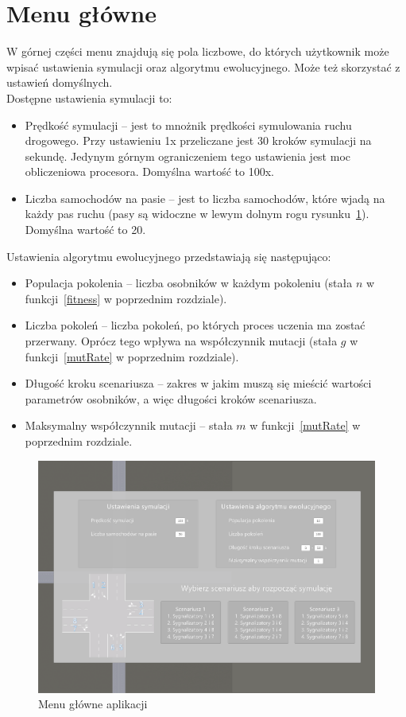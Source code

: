 \section*{Menu główne}
W górnej części menu znajdują się pola liczbowe, do których użytkownik może wpisać ustawienia symulacji oraz algorytmu ewolucyjnego. Może też skorzystać z ustawień domyślnych. \\Dostępne ustawienia symulacji to:
\begin{itemize}
	\item Prędkość symulacji -- jest to mnożnik prędkości symulowania ruchu drogowego. Przy ustawieniu 1x przeliczane jest 30 kroków symulacji na sekundę. Jedynym górnym ograniczeniem tego ustawienia jest moc obliczeniowa procesora. Domyślna wartość to 100x. \\
	\item Liczba samochodów na pasie -- jest to liczba samochodów, które wjadą na każdy pas ruchu (pasy są widoczne w lewym dolnym rogu rysunku~\ref{fig:ap1}). Domyślna wartość to 20.\\
\end{itemize}
Ustawienia algorytmu ewolucyjnego przedstawiają się następująco:
\begin{itemize}
	\item Populacja pokolenia -- liczba osobników w każdym pokoleniu (stała $n$ w funkcji~\ref{fitness} w poprzednim rozdziale).\\
	\item Liczba pokoleń -- liczba pokoleń, po których proces uczenia ma zostać przerwany. Oprócz tego wpływa na współczynnik mutacji (stała $g$ w funkcji~\ref{mutRate} w poprzednim rozdziale).\\
	\item Długość kroku scenariusza -- zakres w jakim muszą się mieścić wartości parametrów osobników, a więc długości kroków scenariusza.\\
	\item Maksymalny współczynnik mutacji -- stała $m$ w funkcji~\ref{mutRate} w poprzednim rozdziale.\\
\end{itemize}
\begin{figure}[h]
	\centering
	\includegraphics[width=1\linewidth]{ap1}
	\caption[Menu główne aplikacji]{Menu główne aplikacji}
	\label{fig:ap1}
\end{figure}
